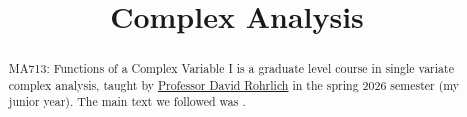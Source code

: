 \documentclass[11pt, letterpaper]{report}
\title{Complex Analysis}
\begin{document}
    \maketitle
    \tableofcontents

    \begin{abstract}
	    MA713: Functions of a Complex Variable I is a graduate level course in single variate complex analysis, taught by \href{https://math.bu.edu/people/rohrlich/}{Professor David Rohrlich} in the spring 2026 semester (my junior year). The main text we followed was \cite{greene-krantz}.
    \end{abstract}
    
    
    
    
    
    
    
    
    
    
    
    
    
    
    
    
    
\end{document}
